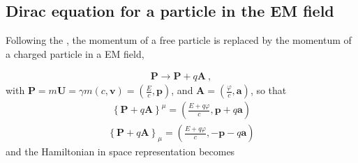 \documentclass[letterpaper,10pt,english]{jupyterBook}
\begin{document}
\subsection{Dirac equation for a particle in the EM field}
\label{\detokenize{ch/quantum-mechanics/relativistic-qm/dirac-equation:dirac-equation-for-a-particle-in-the-em-field}}
\sphinxAtStartPar
Following the , the momentum of a free particle is replaced by the momentum of a charged particle in a EM field,%
\begin{footnote}[1]\sphinxAtStartFootnote
{}
%
\end{footnote}
\begin{equation*}
\begin{split}\mathbf{P} \rightarrow  \mathbf{P} + q \mathbf{A} \ ,\end{split}
\end{equation*}
\sphinxAtStartPar
with \(\mathbf{P} = m \mathbf{U} = \gamma m ( c, \mathbf{v} ) = \left( \frac{E}{c}, \mathbf{p} \right)\), and \(\mathbf{A} = \left( \frac{\varphi}{c}, \mathbf{a} \right)\), so that
\begin{equation*}
\begin{split}\left\{ \mathbf{P} + q \mathbf{A} \right\}^{\mu} = \left( \frac{E + q \varphi}{c}, \mathbf{p} + q \mathbf{a} \right)\end{split}
\end{equation*}\begin{equation*}
\begin{split}\left\{ \mathbf{P} + q \mathbf{A} \right\}_{\mu} = \left( \frac{E + q \varphi}{c}, -\mathbf{p} - q \mathbf{a} \right)\end{split}
\end{equation*}
\sphinxAtStartPar
and the Hamiltonian in space representation becomes
\end{document}
